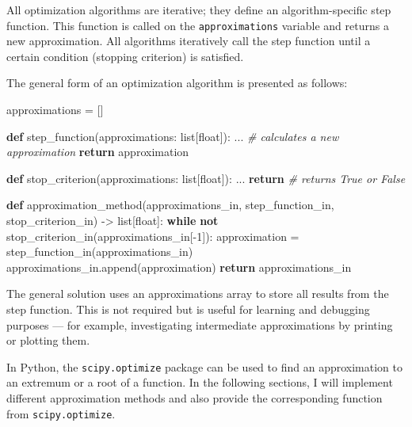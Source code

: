 \documentclass[11pt]{article}
\newenvironment{Shaded}{}{}
\newcommand{\KeywordTok}[1]{\textcolor[rgb]{0.00,0.44,0.13}{\textbf{{#1}}}}
\newcommand{\DecValTok}[1]{\textcolor[rgb]{0.25,0.63,0.44}{{#1}}}
\newcommand{\CommentTok}[1]{\textcolor[rgb]{0.38,0.63,0.69}{\textit{{#1}}}}
\newcommand{\NormalTok}[1]{{#1}}
\newcommand{\ControlFlowTok}[1]{\textcolor[rgb]{0.00,0.44,0.13}{\textbf{{#1}}}}
\newcommand{\OperatorTok}[1]{\textcolor[rgb]{0.40,0.40,0.40}{{#1}}}
\newcommand{\BuiltInTok}[1]{{#1}}
\begin{document}
All optimization algorithms are iterative; they define an
algorithm-specific step function. This function is called on the
\texttt{approximations} variable and returns a new approximation. All
algorithms iteratively call the step function until a certain condition
(stopping criterion) is satisfied.

The general form of an optimization algorithm is presented as follows:

\begin{Shaded}
\begin{Highlighting}[]
\NormalTok{approximations }\OperatorTok{=}\NormalTok{ []}

\KeywordTok{def}\NormalTok{ step\_function(approximations: }\BuiltInTok{list}\NormalTok{[}\BuiltInTok{float}\NormalTok{]):}
\NormalTok{    ... }\CommentTok{\# calculates a new approximation}
    \ControlFlowTok{return}\NormalTok{ approximation}

\KeywordTok{def}\NormalTok{ stop\_criterion(approximations: }\BuiltInTok{list}\NormalTok{[}\BuiltInTok{float}\NormalTok{]):}
\NormalTok{    ...}
    \ControlFlowTok{return}  \CommentTok{\# returns True or False}

\KeywordTok{def}\NormalTok{ approximation\_method(approximations\_in, }
\NormalTok{                         step\_function\_in, }
\NormalTok{                         stop\_criterion\_in) }\OperatorTok{{-}\textgreater{}} \BuiltInTok{list}\NormalTok{[}\BuiltInTok{float}\NormalTok{]:}
    \ControlFlowTok{while} \KeywordTok{not}\NormalTok{ stop\_criterion\_in(approximations\_in[}\OperatorTok{{-}}\DecValTok{1}\NormalTok{]):}
\NormalTok{        approximation }\OperatorTok{=}\NormalTok{ step\_function\_in(approximations\_in)}
\NormalTok{        approximations\_in.append(approximation)}
    \ControlFlowTok{return}\NormalTok{ approximations\_in}
\end{Highlighting}
\end{Shaded}

The general solution uses an approximations array to store all results
from the step function. This is not required but is useful for learning
and debugging purposes --- for example, investigating intermediate
approximations by printing or plotting them.

In Python, the \texttt{scipy.optimize} package can be used to find an
approximation to an extremum or a root of a function. In the following
sections, I will implement different approximation methods and also
provide the corresponding function from \texttt{scipy.optimize}.
\end{document}
